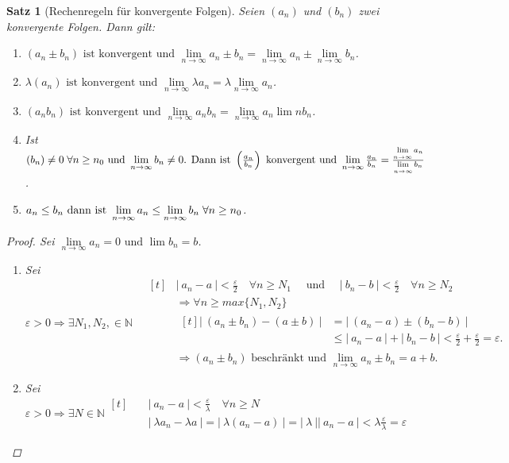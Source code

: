 \documentclass[a4paper,titlepage,oneside]{article}
\def\N{\ensuremath{\mathbb{N}} }
\renewcommand{\epsilon}{\ensuremath{\varepsilon}}
\def\sp{\hspace{0,1cm}}
\renewcommand{\liminf}[2][n]{\ensuremath{\lim\limits_{#1 \rightarrow \infty}{#2}}}
\newcommand{\abs}[1]{\ensuremath{\left|\:#1\:\right|}}
\theoremstyle{thmstyle}
\newtheorem{satz}{Satz}[subsection]
\begin{document}
\begin{satz}[Rechenregeln für konvergente Folgen]
Seien \((a_n)\) und \((b_n)\) zwei konvergente Folgen. Dann gilt:
\begin{enumerate}
\item \((a_n \pm b_n)\text{ ist konvergent und }\liminf{a_n  \pm  b_n} = \liminf{a_n}  \pm \liminf{b_n}\).
\item \(\lambda (a_n)\text{ ist konvergent und }\liminf{\lambda a_n} = \lambda \liminf{a_n}\).
\item \((a_n b_n)\text{ ist konvergent und }\liminf{a_n b_n} = \liminf{a_n} \lim{n}{b_n}\).
\item Ist \((b_n) \ne 0 \sp \forall n \ge n_0\text{ und }\liminf{b_n} \ne 0\text{. Dann ist } \left(\frac{a_n}{b_n}\right) \text{ konvergent und }\liminf{\frac{a_n}{b_n}} = \frac{\liminf{a_n}}{\liminf{b_n}}\).
\item \(a_n \le b_n \text{ dann ist }\liminf{a_n} \le \liminf{b_n} \sp \forall n \ge n_0\).
\end{enumerate}
\begin{proof}
Sei \(\liminf{a_n} = 0\text{ und } \lim{b_n} = b\).
\begin{enumerate}
\item Sei $\epsilon > 0 \Rightarrow \exists N_1, N_2, \in \N \quad 
\begin{aligned}[t]
&\abs{a_n - a} < \frac{\epsilon}{2} \quad \forall n \ge N_1 \quad \text{ und } \quad  \abs{b_n - b} < \frac{\epsilon}{2} \quad \forall n \ge N_2\\
&\Rightarrow \forall n \ge max\{N_1, N_2\}\\
& \begin{aligned}[t]
\abs{(a_n \pm b_n) - (a \pm b)} &= \abs{(a_n - a) \pm (b_n - b)} \\
&\le \abs{a_n - a} + \abs{b_n - b} < \frac{\epsilon}{2} + \frac{\epsilon}{2} = \epsilon.
\end{aligned}\\
&\Rightarrow (a_n \pm b_n) \text{ beschränkt und } \liminf{a_n \pm b_n} = a+b.
\end{aligned}$
\item Sei $ \displaystyle \epsilon > 0 \Rightarrow \exists N \in \N \begin{aligned}[t] \quad 
		&\abs{a_n - a} < \frac{\epsilon}{\lambda} \quad \forall n \ge N\\
		& \abs{\lambda a_n - \lambda a} = \abs{\lambda(a_n - a)} = \abs{\lambda}\abs{a_n - a} < \lambda \frac{\epsilon}{\lambda} = \epsilon
		\end{aligned}$

\end{enumerate}
\end{proof}
\end{satz}
\end{document}
